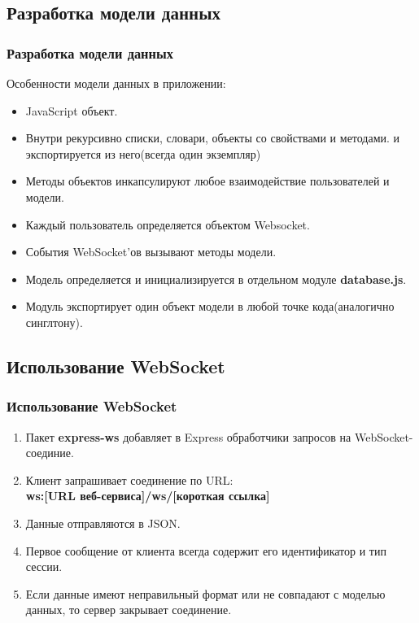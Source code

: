 \documentclass{beamer}
\begin{document}
\subsection{Разработка модели данных}
\begin{frame}
\frametitle{Разработка модели данных}
	Особенности модели данных в приложении:
	\begin{itemize}
		\item JavaScript объект.
		\item Внутри рекурсивно списки, словари, объекты со свойствами и методами.
		 и экспортируется из него(всегда один экземпляр)
		\item Методы объектов инкапсулируют любое взаимодействие пользователей и модели.
		\item Каждый пользователь определяется объектом Websocket.
		\item События WebSocket'ов вызывают методы модели. 
		\item Модель определяется и инициализируется в отдельном модуле \textbf{database.js}.
		\item Модуль экспортирует один объект модели в любой точке кода(аналогично синглтону).
	\end{itemize}
\end{frame}





\subsection{Использование WebSocket}
\begin{frame}
\frametitle{Использование WebSocket}
	\begin{enumerate}
		\item Пакет \textbf{express-ws} добавляет в Express обработчики запросов на WebSocket-соединие.
		\item Клиент запрашивает соединение по URL:\\ \textbf{ws:[URL веб-сервиса]/ws/[короткая ссылка]}	  
		\item Данные отправляются в JSON. 
		\item Первое сообщение от клиента всегда содержит его идентификатор и тип сессии. 
		\item Если данные имеют неправильный формат или не совпадают с моделью данных, то сервер закрывает соединение.
	\end{enumerate}
\end{frame}
\end{document}
